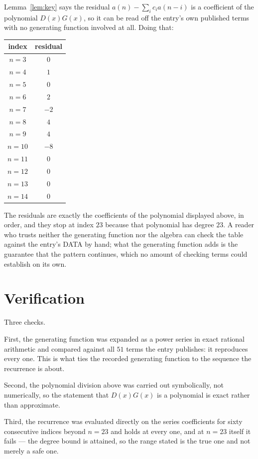 \documentclass[11pt,a4paper]{article}
\theoremstyle{plain}
\theoremstyle{definition}
\begin{document}
Lemma~\ref{lem:key} says the residual $a(n)-\sum_ic_ia(n-i)$ is a coefficient of the
polynomial $D(x)G(x)$, so it can be read off the entry's own published terms with no
generating function involved at all. Doing that:
\begin{center}
\begin{tabular}{cc}
index & residual \\ \hline
$n=3$ & $0$ \\
$n=4$ & $1$ \\
$n=5$ & $0$ \\
$n=6$ & $2$ \\
$n=7$ & $-2$ \\
$n=8$ & $4$ \\
$n=9$ & $4$ \\
$n=10$ & $-8$ \\
$n=11$ & $0$ \\
$n=12$ & $0$ \\
$n=13$ & $0$ \\
$n=14$ & $0$
\end{tabular}
\end{center}
The residuals are exactly the coefficients of the polynomial displayed above, in order, and
they stop at index $23$ because that polynomial has degree $23$. A reader who trusts
neither the generating function nor the algebra can check the table against the entry's DATA
by hand; what the generating function adds is the guarantee that the pattern continues, which
no amount of checking terms could establish on its own.

\section{Verification}

Three checks.

First, the generating function was expanded as a power series in exact rational arithmetic and
compared against all $51$ terms the entry publishes: it reproduces every one. This is
what ties the recorded generating function to the sequence the recurrence is about.

Second, the polynomial division above was carried out symbolically, not numerically, so the
statement that $D(x)G(x)$ is a polynomial is exact rather than approximate.

Third, the recurrence was evaluated directly on the series coefficients for sixty consecutive
indices beyond $n=23$ and holds at every one, and at $n=23$ itself it fails --- the
degree bound is attained, so the range stated is the true one and not merely a safe one.
\end{document}
